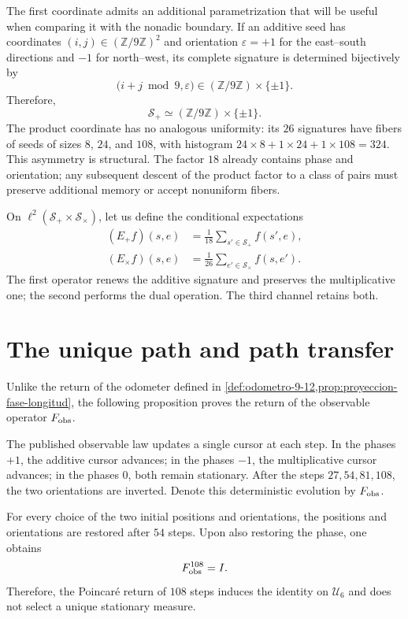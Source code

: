 The first coordinate admits an additional parametrization that will be useful when
comparing it with the nonadic boundary. If an additive seed has coordinates
\((i,j)\in(\mathbb Z/9\mathbb Z)^2\) and orientation
\(\varepsilon=+1\) for the east--south directions and \(-1\) for
north--west, its complete signature is determined bijectively by
\[
 \bigl(i+j\bmod9,\varepsilon\bigr)
 \in(\mathbb Z/9\mathbb Z)\times\{\pm1\}.
\]
Therefore,
\[
 \boxed{\mathcal S_+\simeq
 (\mathbb Z/9\mathbb Z)\times\{\pm1\}.}
\]
The product coordinate has no analogous uniformity: its \(26\) signatures
have fibers of seeds of sizes \(8\), \(24\), and \(108\), with histogram
\(24\times8+1\times24+1\times108=324\). This asymmetry is structural. The
factor \(18\) already contains phase and orientation; any subsequent descent
of the product factor to a class of pairs must preserve additional memory or
accept nonuniform fibers.

On \(\ell^2(\mathcal S_+\times\mathcal S_\times)\), let us define the
conditional expectations
\[
\begin{aligned}
 (E_+f)(s,e)&=\frac1{18}\sum_{s'\in\mathcal S_+}f(s',e),\\
 (E_\times f)(s,e)&=\frac1{26}\sum_{e'\in\mathcal S_\times}f(s,e').
\end{aligned}
\]
The first operator renews the additive signature and preserves the multiplicative
one; the second performs the dual operation. The third channel retains both.

\section{The unique path and path transfer}

Unlike the return of the odometer defined in
\cref{def:odometro-9-12,prop:proyeccion-fase-longitud}, the following proposition
proves the return of the observable operator \(F_{\rm obs}\).

The published observable law updates a single cursor at each step. In the
phases \(+1\), the additive cursor advances; in the phases \(-1\), the
multiplicative cursor advances; in the phases \(0\), both remain stationary. After the
steps \(27,54,81,108\), the two orientations are inverted. Denote this
deterministic evolution by \(F_{\rm obs}\).

\begin{proposition}
\label{prop:retorno-fobs-identidad}
For every choice of the two initial positions and orientations, the
positions and orientations are restored after \(54\) steps. Upon
also restoring the phase, one obtains
\[
 F_{\rm obs}^{108}=I.
\]
Therefore, the Poincaré return of \(108\) steps induces the identity on
\(\mathcal U_6\) and does not select a unique stationary measure.
\end{proposition}

